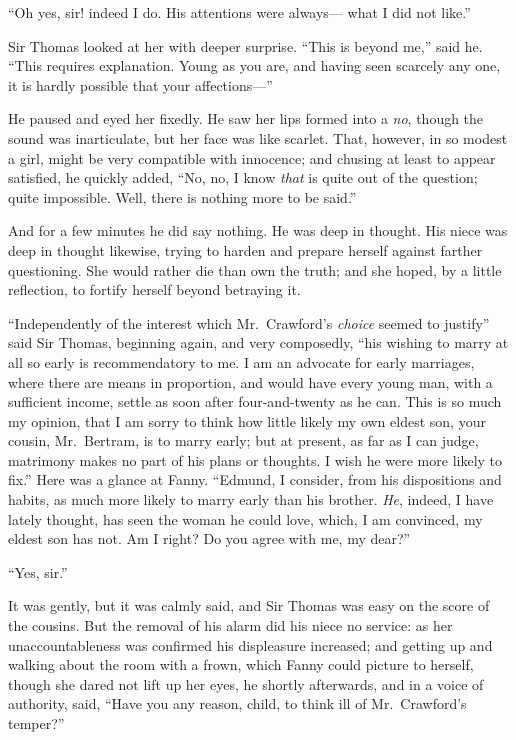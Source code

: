 \documentclass{article}
\begin{document}
``Oh yes, sir! indeed I do.  His attentions were always---%
what I did not like.''

Sir Thomas looked at her with deeper surprise.
``This is beyond me,'' said he.  ``This requires explanation.
Young as you are, and having seen scarcely any one,
it is hardly possible that your affections---''

He paused and eyed her fixedly.  He saw her lips
formed into a \emph{no}, though the sound was inarticulate,
but her face was like scarlet.  That, however, in so
modest a girl, might be very compatible with innocence;
and chusing at least to appear satisfied, he quickly added,
``No, no, I know \emph{that} is quite out of the question;
quite impossible.  Well, there is nothing more to be said.''

And for a few minutes he did say nothing.  He was deep
in thought.  His niece was deep in thought likewise, trying to
harden and prepare herself against farther questioning.
She would rather die than own the truth; and she hoped,
by a little reflection, to fortify herself beyond
betraying it.

``Independently of the interest which Mr.\ Crawford's \emph{choice}
seemed to justify'' said Sir Thomas, beginning again,
and very composedly, ``his wishing to marry at all so
early is recommendatory to me.  I am an advocate for
early marriages, where there are means in proportion,
and would have every young man, with a sufficient income,
settle as soon after four-and-twenty as he can.  This is
so much my opinion, that I am sorry to think how little
likely my own eldest son, your cousin, Mr.\ Bertram,
is to marry early; but at present, as far as I can judge,
matrimony makes no part of his plans or thoughts.
I wish he were more likely to fix.''  Here was a glance
at Fanny.  ``Edmund, I consider, from his dispositions
and habits, as much more likely to marry early than
his brother.  \emph{He}, indeed, I have lately thought,
has seen the woman he could love, which, I am convinced,
my eldest son has not.  Am I right?  Do you agree with me,
my dear?''

``Yes, sir.''

It was gently, but it was calmly said, and Sir Thomas was
easy on the score of the cousins.  But the removal of his
alarm did his niece no service:  as her unaccountableness
was confirmed his displeasure increased; and getting up
and walking about the room with a frown, which Fanny could
picture to herself, though she dared not lift up her eyes,
he shortly afterwards, and in a voice of authority, said,
``Have you any reason, child, to think ill of Mr.\ Crawford's
temper?''
\end{document}
